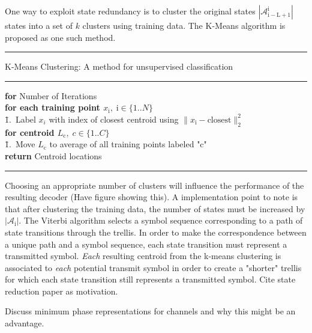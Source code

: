 \documentclass[12pt,a4paper]{article}
\begin{document}
One way to exploit state redundancy is to cluster the original states $|\mathcal{A}_{\mathrm{i-L+1}}^{\mathrm{i}}|$  states into a set of $k$ clusters using training data. The K-Means algorithm is proposed as one such method.
\\

    \noindent\rule[16pt]{\textwidth}{0.6pt}
K-Means Clustering: A method for unsupervised classification

    \noindent\rule[10pt]{\textwidth}{0.4pt}
    {\footnotesize
    \begin{tabbing}
        {\textbf{for} Number of Iterations}\\
         \qquad \= {\bf for each training point $x_{\mathrm{i}}, \;\mathrm{i}  \in \{1..N\}$}\\
        \qquad \qquad \= 1.\ Label $x_i$ with index of closest centroid using $\|x_{\mathrm{i}}- \text{closest}\|^2_2$ \\
        \qquad \= {\bf for centroid $L_{\mathrm{c}}, \;c \in \{1..C\}$}\\
                \qquad \qquad \= 1.\ Move $L_{\mathrm{c}}$ to average of all training points labeled "c"\\


        {\bf return} Centroid locations
    \end{tabbing}}
    \noindent\rule[10pt]{\textwidth}{0.4pt}
    
Choosing an appropriate number of clusters will influence the performance of the resulting decoder (Have figure showing this).
A implementation point to note is that after clustering the training data, the number of states must be increased by $|\mathcal{A}_{\mathrm{i}}|$. The Viterbi algorithm selects a symbol sequence corresponding to a path of state transitions through the trellis. In order to make the correspondence between a unique path and a symbol sequence, each state transition must represent a transmitted symbol. \emph{Each} resulting centroid from the k-means clustering is associated to \emph{each} potential transmit symbol in order to create a "shorter" trellis for which each state transition still represents a transmitted symbol. 
Cite state reduction paper as motivation. 

Discuss minimum phase representations for channels and why this might be an advantage. 
\end{document}
